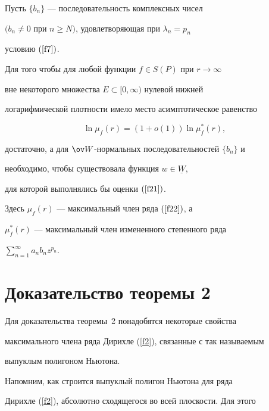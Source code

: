 \begin{thm}


Пусть $\{b_{n}\}$ --- последовательность комплексных чисел


$(b_{n}\neq0$ при $n\geq N)$, удовлетворяющая при $\lambda_{n}=p_{n}$


условию $(\ref{f7})$.





Для того чтобы для любой функции $f\in S(P)$ при $r \to\infty$


вне некоторого множества $E\subset[0,\infty)$ нулевой нижней


логарифмической плотности имело место асимптотическое равенство


$$


\ln \mu_{f}(r)=(1+o(1))\ln\mu_{f}^{*}(r),


$$


достаточно, а для $\ov W$-нормальных последовательностей $\{b_n\}$ и


необходимо, чтобы существовала функция $w\in\underline{W}$,


для которой выполнялись бы оценки $(\ref{f21})$.





Здесь $\mu_{f}(r)$ --- максимальный член ряда $(\ref{f22})$, а


$\mu_{f}^{*}(r)$ --- максимальный член измененного степенного ряда


$\sum\limits_{n=1}^{\infty}a_{n}b_{n}z^{p_{n}}$.


\end{thm}





\section{Доказательство теоремы 2}





Для доказательства теоремы~2 понадобятся некоторые свойства


максимального члена ряда Дирихле (\ref{f2}), связанные с так называемым


выпуклым полигоном Ньютона.





Напомним, как строится выпуклый полигон Ньютона для ряда


Дирихле (\ref{f2}), абсолютно сходящегося во всей плоскости. Для этого


